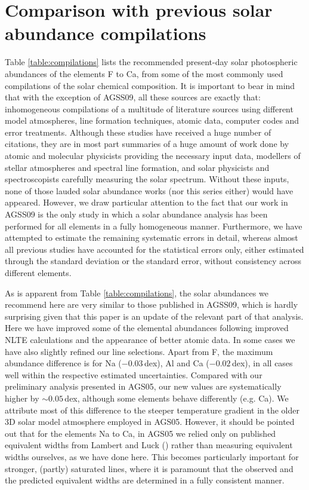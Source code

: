\documentclass[traditabstract]{aa}
\begin{document}
\section{Comparison with previous solar abundance compilations}
\label{s:discussion}

Table \ref{table:compilations} lists the recommended present-day solar photospheric abundances of the elements F to Ca, from some of the most commonly used compilations of the solar chemical composition. It is important to bear in mind that with the exception of AGSS09, all these sources are exactly that: inhomogeneous compilations of a multitude of literature sources using different model atmospheres, line formation techniques, atomic data, computer codes and error treatments. Although these studies have received a huge number of citations, they are in most part summaries of a huge amount of work done by atomic and molecular physicists providing the necessary input data, modellers of stellar atmospheres and spectral line formation, and solar physicists and spectroscopists carefully measuring the solar spectrum.  Without these inputs, none of those lauded solar abundance works (nor this series either) would have appeared. However, we draw particular attention to the fact that our work in AGSS09 is the only study in which a solar abundance analysis has been performed for all elements in a fully homogeneous manner. Furthermore, we have attempted to estimate the remaining systematic errors in detail, whereas almost all previous studies have accounted for the statistical errors only, either estimated through the standard deviation or the standard error, without consistency across different elements. 

As is apparent from  Table \ref{table:compilations}, the solar abundances we recommend here are very similar to those published in AGSS09, which is hardly surprising given that this paper is an update of the relevant part of that analysis. Here we have improved some of the elemental abundances following improved NLTE calculations and the appearance of better atomic data.  In some cases we have also slightly refined our line selections.  Apart from F, the maximum abundance difference is for Na ($-0.03$\,dex), Al and Ca ($-0.02$\,dex), in all cases well within the respective estimated uncertainties.  Compared with our preliminary analysis presented in AGS05, our new values are systematically higher by $\sim$$0.05$\,dex, although some elements behave differently (e.g. Ca). We attribute most of this difference to the steeper temperature gradient in the older 3D solar model atmosphere employed in AGS05.  However, it should be pointed out that for the elements Na to Ca, in AGS05 we relied only on published equivalent widths from Lambert and Luck (\cite{lamb1}) rather than measuring equivalent widths ourselves, as we have done here. This becomes particularly important for stronger, (partly) saturated lines, where it is paramount that the observed and the predicted equivalent widths are determined in a fully consistent manner. 
\end{document}
